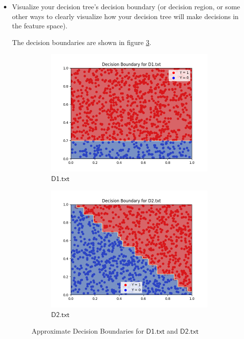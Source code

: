 \documentclass[a4paper]{article}
\theoremstyle{definition}
\newenvironment{soln}{
    \leavevmode\color{blue}\ignorespaces
}{}
\begin{document}
\begin{enumerate}
\begin{itemize}
  \item Visualize your decision tree's decision boundary (or decision region, or some other ways to clearly visualize how your decision tree will make decisions in the feature space).

  \begin{soln}
      The decision boundaries are shown in figure \ref{fig:5}.

      \begin{figure}[H]
          \centering
          \begin{subfigure}{0.5\textwidth}
          \centering
          \includegraphics[width=1.1\linewidth]{Decision_Boundary_D1.png}
          \caption{$\mathsf{D1.txt}$}
          \label{fig:5sub1}
        \end{subfigure}%
        \begin{subfigure}{0.5\textwidth}
          \centering
          \includegraphics[width=1.1\linewidth]{Decision_Boundary_D2.png}
          \caption{$\mathsf{D2.txt}$}
          \label{fig:5sub2}
          \end{subfigure}
          \caption{Approximate Decision Boundaries for $\mathsf{D1.txt}$ and $\mathsf{D2.txt}$}
          \label{fig:5}
      \end{figure}
  \end{soln}


\end{itemize}
\end{enumerate}
\end{document}
